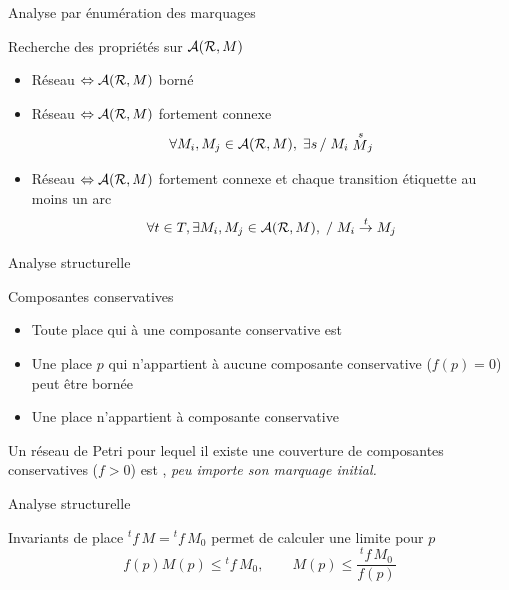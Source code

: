 \documentclass[compress]{beamer}
\begin{document}
\begin{frame}{Analyse par énumération des marquages}
\begin{block}{Recherche des propriétés sur ${\cal A(R},M)$}
\begin{itemize}
\item Réseau  $\Leftrightarrow {\cal A(R},M)$ borné
\item Réseau  $\Leftrightarrow {\cal A(R},M)$ fortement connexe
$$\forall M_i, M_j \in {\cal A(R},M), \; \exists s \, / \; M_i \stackrel{s} M_j$$
\item Réseau  $\Leftrightarrow {\cal A(R},M)$ fortement connexe et chaque transition étiquette au moins un arc
$$\forall t \in T, \exists M_i, M_j \in {\cal A(R},M), \; / \; M_i
\stackrel{t}{\rightarrow} M_j$$
\end{itemize}  
\end{block}
\end{frame}  

 
\begin{frame}{Analyse structurelle}
\begin{block}{Composantes conservatives}
\begin{itemize}
\item Toute place qui  à une composante conservative  est 
\item Une place $p$ qui n'appartient à aucune composante conservative ($f(p)=0$) peut être bornée
\item Une place  n'appartient à  composante conservative
\end{itemize}
Un réseau de Petri pour lequel il existe une couverture de composantes 
conservatives ($f>0$) est , {\it peu importe son marquage initial.}
\end{block}
\end{frame}  
 
\begin{frame}{Analyse structurelle}
\begin{block}{Invariants de place}
${}^tf \, M = {}^tf \, M_0$ permet de calculer une limite pour  $p$
$$f(p) M(p) \leq {}^tf \, M_0, \qquad M(p) \leq \frac{{}^tf \, M_0}{f(p)}$$
\end{block}
\end{frame}  
\end{document}
